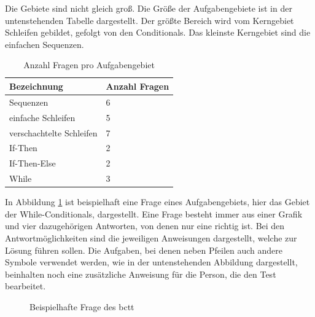 Die Gebiete sind nicht gleich groß. Die Größe der Aufgabengebiete ist in der untenstehenden Tabelle dargestellt. Der größte Bereich wird vom Kerngebiet Schleifen gebildet, gefolgt von den Conditionals. Das kleinste Kerngebiet sind die einfachen Sequenzen.

\begin{table}[H]
	\centering
	\begin{tabular}{|l|l|}
		\hline
		Bezeichnung              & Anzahl Fragen \\ \hline
		Sequenzen                & 6             \\ \hline
		einfache Schleifen       & 5             \\ \hline
		verschachtelte Schleifen & 7             \\ \hline
		If-Then                  & 2             \\ \hline
		If-Then-Else             & 2             \\ \hline
		While                    & 3             \\ \hline
	\end{tabular}
	\caption{Anzahl Fragen pro Aufgabengebiet}
	\label{tab:distQuestions}
\end{table}

In Abbildung \ref{img:bcttQuestion} ist beispielhaft eine Frage eines Aufgabengebiets, hier das Gebiet der While-Conditionals, dargestellt. Eine Frage besteht immer aus einer Grafik und vier dazugehörigen Antworten, von denen nur eine richtig ist. Bei den Antwortmöglichkeiten sind die jeweiligen Anweisungen dargestellt, welche zur Lösung führen sollen. Die Aufgaben, bei denen neben Pfeilen auch andere Symbole verwendet werden, wie in der untenstehenden Abbildung dargestellt, beinhalten noch eine zusätzliche Anweisung für die Person, die den Test bearbeitet. 

\begin{figure}[H]
	\centering
	\caption[Beispielhafte Frage des \acrshort{bctt}]{Beispielhafte Frage des \acrshort{bctt}\cite{bcct}}
	\label{img:bcttQuestion}
\end{figure}

